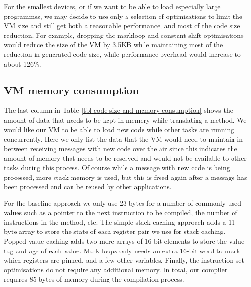 For the smallest devices, or if we want to be able to load especially large programmes, we may decide to use only a selection of optimisations to limit the VM size and still get both a reasonable performance, and most of the code size reduction. For example, dropping the markloop and constant shift optimisations would reduce the size of the VM by 3.5KB while maintaining most of the reduction in generated code size, while performance overhead would increase to about 126\%.



\subsection{VM memory consumption} The last column in Table \ref{tbl-code-size-and-memory-consumption} shows the amount of data that needs to be kept in memory while translating a method. We would like our VM to be able to load new code while other tasks are running concurrently. Here we only list the data that the VM would need to maintain in between receiving messages with new code over the air since this indicates the amount of memory that needs to be reserved and would not be available to other tasks during this process. Of course while a message with new code is being processed, more stack memory is used, but this is freed again after a message has been processed and can be reused by other applications.

For the baseline approach we only use 23 bytes for a number of commonly used values such as a pointer to the next instruction to be compiled, the number of instructions in the method, etc. The simple stack caching approach adds a 11 byte array to store the state of each register pair we use for stack caching. Popped value caching adds two more arrays of 16-bit elements to store the value tag and age of each value. Mark loops only needs an extra 16-bit word to mark which registers are pinned, and a few other variables. Finally, the instruction set optimisations do not require any additional memory. In total, our compiler requires 85 bytes of memory during the compilation process.


